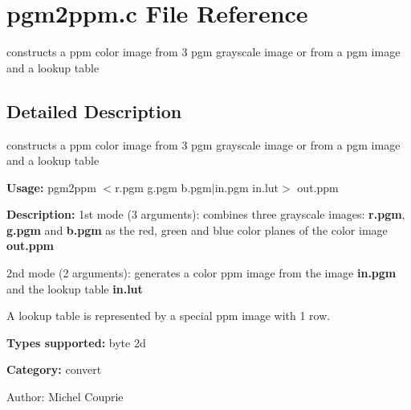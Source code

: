 \section{pgm2ppm.c File Reference}
\label{pgm2ppm_8c}
constructs a ppm color image from 3 pgm grayscale image or from a pgm image and a lookup table  




\label{_details}
\subsection{Detailed Description}
constructs a ppm color image from 3 pgm grayscale image or from a pgm image and a lookup table 

{\bf Usage:} pgm2ppm $<$r.pgm g.pgm b.pgm$|$in.pgm in.lut$>$ out.ppm

{\bf Description:} 1st mode (3 arguments): combines three grayscale images: {\bf r.pgm}, {\bf g.pgm} and {\bf b.pgm} as the red, green and blue color planes of the color image {\bf out.ppm}

2nd mode (2 arguments): generates a color ppm image from the image {\bf in.pgm} and the lookup table {\bf in.lut}

A lookup table is represented by a special ppm image with 1 row.

{\bf Types supported:} byte 2d

{\bf Category:} convert

\begin{Desc}
\item[Author:]Michel Couprie \end{Desc}
